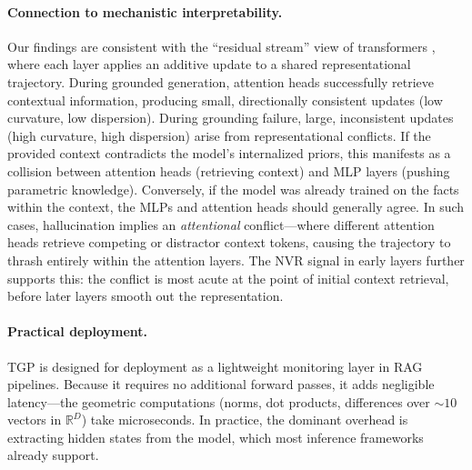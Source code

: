 \documentclass[10pt]{article}
\newcommand{\tgp}{\textsc{TGP}\xspace}
\newcommand{\R}{\mathbb{R}}
\begin{document}
\paragraph{Connection to mechanistic interpretability.}
Our findings are consistent with the ``residual stream'' view of transformers \citep{elhage2021mathematical}, where each layer applies an additive update to a shared representational trajectory.
During grounded generation, attention heads successfully retrieve contextual information, producing small, directionally consistent updates (low curvature, low dispersion).
During grounding failure, large, inconsistent updates (high curvature, high dispersion) arise from representational conflicts. If the provided context contradicts the model's internalized priors, this manifests as a collision between attention heads (retrieving context) and MLP layers (pushing parametric knowledge). Conversely, if the model was already trained on the facts within the context, the MLPs and attention heads should generally agree. In such cases, hallucination implies an \emph{attentional} conflict---where different attention heads retrieve competing or distractor context tokens, causing the trajectory to thrash entirely within the attention layers.
The NVR signal in early layers further supports this: the conflict is most acute at the point of initial context retrieval, before later layers smooth out the representation.

\paragraph{Practical deployment.}
\tgp is designed for deployment as a lightweight monitoring layer in RAG pipelines.
Because it requires no additional forward passes, it adds negligible latency---the geometric computations (norms, dot products, differences over ${\sim}10$ vectors in $\R^D$) take microseconds.
In practice, the dominant overhead is extracting hidden states from the model, which most inference frameworks already support.
\end{document}
